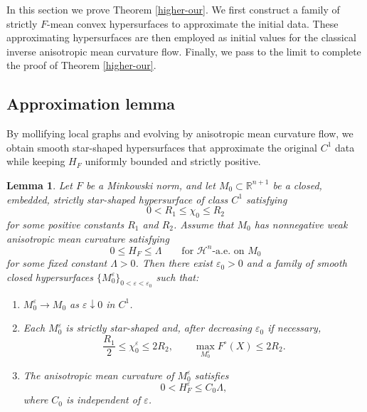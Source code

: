 \documentclass[11pt,reqno]{amsart}
\newtheorem{lemma}[proposition]{Lemma}
\theoremstyle{definition}
\theoremstyle{remark}
\numberwithin{equation}{section}
\begin{document}
	In this section we prove Theorem \ref{higher-our}. 	We first construct a family of strictly $F$-mean convex hypersurfaces to approximate the initial data. These approximating hypersurfaces are then employed as initial values for the classical inverse anisotropic mean curvature flow. Finally, we pass to the limit to complete the proof of Theorem \ref{higher-our}. 
	
	\subsection{Approximation lemma}\label{sec.4-1}
	By mollifying local graphs and evolving by anisotropic mean curvature flow, we obtain smooth star-shaped hypersurfaces that approximate the original $C^1$ data while keeping $H_F$ uniformly bounded and strictly positive.

\begin{lemma}
\label{lem-approximate}
Let $F$ be a Minkowski norm, and let $M_0\subset\mathbb{R}^{n+1}$ be a closed, embedded, strictly
star-shaped hypersurface of class $C^1$ satisfying
\begin{equation*}
 0<R_1\leq \chi_0\leq R_2
\end{equation*}
for some positive constants $R_1$ and $R_2$. Assume that $M_0$ has nonnegative weak anisotropic mean curvature satisfying
\begin{equation}
\label{eq:initial-H-approx}
 0\leq H_F\leq\Lambda
 \qquad\text{for }\mathcal H^n\text{-a.e. on }M_0
\end{equation}
for some fixed constant $\Lambda>0$. Then there exist
$\varepsilon_0>0$ and a family of smooth closed hypersurfaces
$\{M_0^\varepsilon\}_{0<\varepsilon<\varepsilon_0}$ such that:
\begin{enumerate}
 \item[\textup{(a)}] $  M_0^\varepsilon\longrightarrow M_0$ as $\varepsilon\downarrow0$ in $C^1$.

 \item[\textup{(b)}]
 Each $M_0^\varepsilon$ is strictly star-shaped and, after decreasing
 $\varepsilon_0$ if necessary,
 \begin{equation}
 \label{equ-anibd}
  \frac{R_1}{2}\leq\chi_0^\varepsilon\leq2R_2,
  \qquad
  \max_{M_0^\varepsilon}F^\circ(X)\leq2R_2.
 \end{equation}

 \item[\textup{(c)}]
 The anisotropic mean curvature of $M_0^\varepsilon$ satisfies
 \begin{equation*}
  0<H_F^\varepsilon\leq C_0\Lambda,
 \end{equation*}
 where $C_0$ is independent of $\varepsilon$.
\end{enumerate}
\end{lemma}
\end{document}
